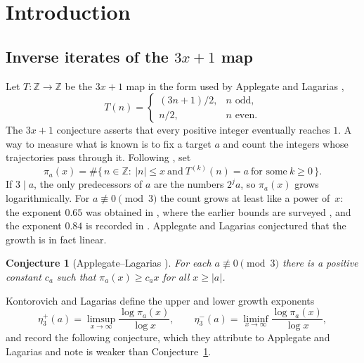 \documentclass[11pt]{amsart}
\newtheorem{conjecture}[theorem]{Conjecture}
\theoremstyle{definition}
\theoremstyle{remark}
\newcommand{\Z}{\mathbb{Z}}
\begin{document}
\section{Introduction}\label{sec:intro}

\subsection{Inverse iterates of the \texorpdfstring{$3x+1$}{3x+1} map}
Let $T\colon\Z\to\Z$ be the $3x+1$ map in the form used by Applegate and Lagarias
\cite[(1.1)]{AL95a},
\[
  T(n)=\begin{cases} (3n+1)/2, & n\text{ odd},\\ n/2, & n\text{ even}.\end{cases}
\]
The $3x+1$ conjecture asserts that every positive integer eventually reaches $1$. A way to measure
what is known is to fix a target $a$ and count the integers whose trajectories pass through it. Following \cite[(1.2)]{AL95a}, set
\begin{equation}\label{eq:pi}
  \pi_a(x)=\#\{\,n\in\Z:\ |n|\le x\ \text{and}\ T^{(k)}(n)=a\ \text{for some}\ k\ge0\,\}.
\end{equation}
If $3\mid a$, the only predecessors of $a$ are the numbers $2^ja$, so $\pi_a(x)$ grows
logarithmically. For $a\not\equiv0\pmod3$ the count grows at least like a power of~$x$: the
exponent $0.65$ was obtained in \cite[Theorem~1.2]{AL95a}, where the earlier bounds are surveyed
\cite[\S1]{AL95a}, and the exponent $0.84$ is recorded in \cite[Theorem~2.5]{KontorovichLagarias10}.
Applegate and Lagarias conjectured that the growth is in fact linear.

\begin{conjecture}[Applegate--Lagarias {\cite[Conjecture~A]{AL95a}}]\label{conj:A}
For each $a\not\equiv0\pmod3$ there is a positive constant $c_a$ such that $\pi_a(x)\ge c_a x$ for
all $x\ge|a|$.
\end{conjecture}

Kontorovich and Lagarias \cite[Definition~2.11]{KontorovichLagarias10} define the upper and lower
growth exponents
\[
  \eta_3^{+}(a)=\limsup_{x\to\infty}\frac{\log\pi_a(x)}{\log x},\qquad
  \eta_3^{-}(a)=\liminf_{x\to\infty}\frac{\log\pi_a(x)}{\log x},
\]
and record the following conjecture, which they attribute to Applegate and Lagarias and note is
weaker than Conjecture~\ref{conj:A}.
\end{document}
